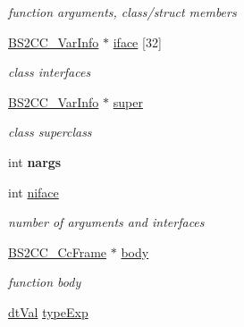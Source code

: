 \begin{DoxyCompactItemize}
\begin{DoxyCompactList}\small\item\em function arguments, class/struct members \end{DoxyCompactList}\item 
\hypertarget{structBS2CC__VarInfo__s_a44c39d9533447c4fe878f651e2da6ee2}{\hyperlink{structBS2CC__VarInfo__s}{B\-S2\-C\-C\-\_\-\-Var\-Info} $\ast$ \hyperlink{structBS2CC__VarInfo__s_a44c39d9533447c4fe878f651e2da6ee2}{iface} \mbox{[}32\mbox{]}}\label{structBS2CC__VarInfo__s_a44c39d9533447c4fe878f651e2da6ee2}

\begin{DoxyCompactList}\small\item\em class interfaces \end{DoxyCompactList}\item 
\hypertarget{structBS2CC__VarInfo__s_a330b2f634f9208fb2dbc60295fc51369}{\hyperlink{structBS2CC__VarInfo__s}{B\-S2\-C\-C\-\_\-\-Var\-Info} $\ast$ \hyperlink{structBS2CC__VarInfo__s_a330b2f634f9208fb2dbc60295fc51369}{super}}\label{structBS2CC__VarInfo__s_a330b2f634f9208fb2dbc60295fc51369}

\begin{DoxyCompactList}\small\item\em class superclass \end{DoxyCompactList}\item 
\hypertarget{structBS2CC__VarInfo__s_a78ab8782381ec92958ba7d3b54ea20cb}{int {\bfseries nargs}}\label{structBS2CC__VarInfo__s_a78ab8782381ec92958ba7d3b54ea20cb}

\item 
\hypertarget{structBS2CC__VarInfo__s_a90ca37e1f84fd2494fc94a7620517065}{int \hyperlink{structBS2CC__VarInfo__s_a90ca37e1f84fd2494fc94a7620517065}{niface}}\label{structBS2CC__VarInfo__s_a90ca37e1f84fd2494fc94a7620517065}

\begin{DoxyCompactList}\small\item\em number of arguments and interfaces \end{DoxyCompactList}\item 
\hypertarget{structBS2CC__VarInfo__s_ab80865237839e153974d99e4e708306f}{\hyperlink{structBS2CC__CcFrame__s}{B\-S2\-C\-C\-\_\-\-Cc\-Frame} $\ast$ \hyperlink{structBS2CC__VarInfo__s_ab80865237839e153974d99e4e708306f}{body}}\label{structBS2CC__VarInfo__s_ab80865237839e153974d99e4e708306f}

\begin{DoxyCompactList}\small\item\em function body \end{DoxyCompactList}\item 
\hypertarget{structBS2CC__VarInfo__s_aaf628da34c691886bc4b4eb0bb010cc1}{\hyperlink{unionBGBDT__TagValue__s}{dt\-Val} \hyperlink{structBS2CC__VarInfo__s_aaf628da34c691886bc4b4eb0bb010cc1}{type\-Exp}}\label{structBS2CC__VarInfo__s_aaf628da34c691886bc4b4eb0bb010cc1}


\end{DoxyCompactItemize}
